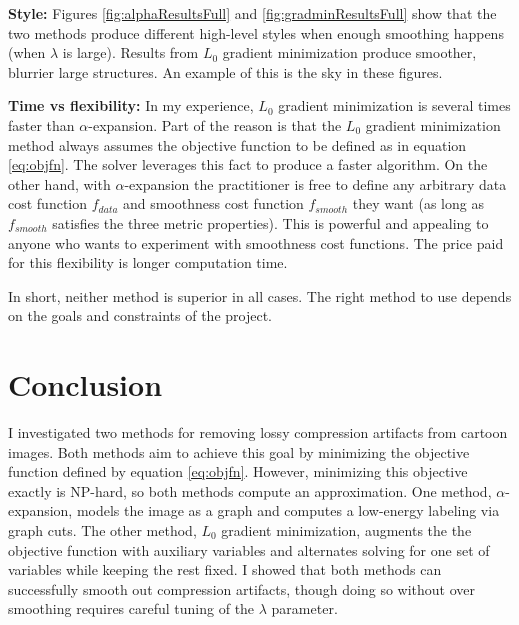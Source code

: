 \documentclass[10pt,twocolumn,letterpaper]{article}
\begin{document}
{\bf Style: } Figures \ref{fig:alphaResultsFull} and \ref{fig:gradminResultsFull} show that the two methods produce different high-level styles when enough smoothing happens (when $\lambda$ is large). Results from $L_0$ gradient minimization produce smoother, blurrier large structures. An example of this is the sky in these figures.

{\bf Time vs flexibility: } In my experience, $L_0$ gradient minimization is several times faster than $\alpha$-expansion. Part of the reason is that the $L_0$ gradient minimization method always assumes the objective function to be defined as in equation \ref{eq:objfn}. The solver leverages this fact to produce a faster algorithm. On the other hand, with $\alpha$-expansion the practitioner is free to define any arbitrary data cost function $f_{data}$ and smoothness cost function $f_{smooth}$ they want (as long as $f_{smooth}$ satisfies the three metric properties). This is powerful and appealing to anyone who wants to experiment with smoothness cost functions. The price paid for this flexibility is longer computation time.

In short, neither method is superior in all cases. The right method to use depends on the goals and constraints of the project.

\section{Conclusion}
I investigated two methods for removing lossy compression artifacts from cartoon images. Both methods aim to achieve this goal by minimizing the objective function defined by equation \ref{eq:objfn}. However, minimizing this objective exactly is NP-hard, so both methods compute an approximation.
One method, $\alpha$-expansion, models the image as a graph and computes a low-energy labeling via graph cuts. The other method, $L_0$ gradient minimization, augments the the objective function with auxiliary variables and alternates solving for one set of variables while keeping the rest fixed. I showed that both methods can successfully smooth out compression artifacts, though doing so without over smoothing requires careful tuning of the $\lambda$ parameter.
\end{document}
